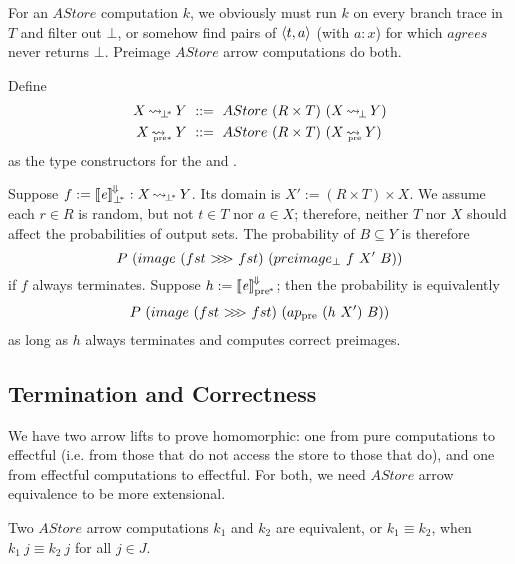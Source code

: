 \documentclass{llncs}
\newcommand{\arrow}{\rightsquigarrow}
\newcommand{\conv}{^{\mspace{-2mu}\Downarrow\mspace{-2mu}}}
\newcommand{\meaningofconv}[1]{\left\llbracket{#1}\right\rrbracket\conv}
\newcommand{\arrowcomp}{\ensuremath{{>}\mspace{-6mu}{>}\mspace{-6mu}{>}}}
\DeclareMathOperator{\botto}{\arrow_{\mspace{-3mu}\bot}}
\newcommand{\pre}{_\mathrm{pre}}
\DeclareMathOperator{\preto}{\arrow_{\mspace{-19mu}\pre}}
\newcommand{\pbot}{{\bot^{\mspace{-4mu}*}}}
\DeclareMathOperator{\pbotto}{\arrow_{\mspace{-3mu}\pbot}}
\newcommand{\ppre}{_\mathrm{pre^{\mspace{-2mu}*}}}
\DeclareMathOperator{\ppreto}{\arrow_{\mspace{-19mu}_{\mathrm{pre*}}}}
\begin{document}
For an $AStore$ computation $k$, we obviously must run $k$ on every branch trace in $T$ and filter out $\bot$, or somehow find pairs of $\langle{t,a}\rangle$ (with $a : x$) for which $agrees$ never returns $\bot$.
Preimage $AStore$ arrow computations do both.

\begin{definition}
Define
\begin{equation}
\begin{aligned}
	X \pbotto Y &\ ::=\ AStore~(R \times T)~(X \botto Y) \\
	X \ppreto Y &\ ::=\ AStore~(R \times T)~(X \preto Y) \\
\end{aligned}
\end{equation}
as the type constructors for the  and .
\end{definition}

Suppose $f := \meaningofconv{\mathit{e}}_\pbot : X \pbotto Y$.
Its domain is $X' := (R \times T) \times X$.
We assume each $r \in R$ is random, but not $t \in T$ nor $a \in X$; therefore, neither $T$ nor $X$ should affect the probabilities of output sets.
The probability of $B \subseteq Y$ is therefore
\begin{equation}
	P~(image~(fst~\arrowcomp~fst)~(preimage_\bot~f~X'~B))
\end{equation}
if $f$ always terminates.
Suppose $h := \meaningofconv{\mathit{e}}\ppre$; then the probability is equivalently
\begin{equation}
	P~(image~(fst~\arrowcomp~fst)~(ap\pre~(h~X')~B))
\end{equation}
as long as $h$ always terminates and computes correct preimages.

\subsection{Termination and Correctness}

We have two arrow lifts to prove homomorphic: one from pure computations to effectful (i.e. from those that do not access the store to those that do), and one from effectful computations to effectful.
For both, we need $AStore$ arrow equivalence to be more extensional.

\begin{definition}
Two $AStore$ arrow computations $k_1$ and $k_2$ are equivalent, or $k_1 \equiv k_2$, when $k_1~j \equiv k_2~j$ for all $j \in J$.
\end{definition}
\end{document}
